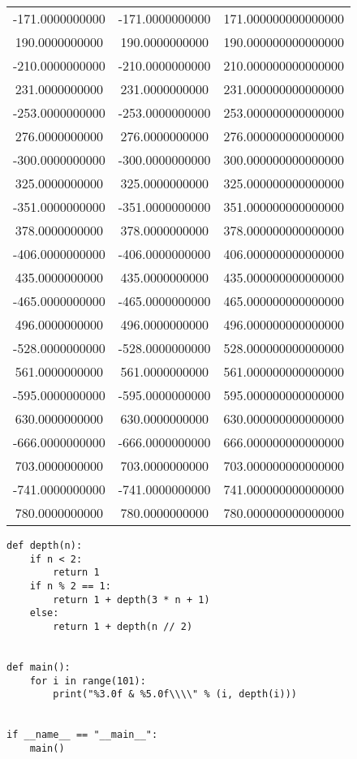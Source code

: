 \documentclass[12pt]{scrartcl}
\begin{document}
\begin{table}[H]
\begin{tabular}{ccc}
        -171.0000000000 & -171.0000000000 & 171.000000000000000 \\
        190.0000000000  & 190.0000000000  & 190.000000000000000 \\
        -210.0000000000 & -210.0000000000 & 210.000000000000000 \\
        231.0000000000  & 231.0000000000  & 231.000000000000000 \\
        -253.0000000000 & -253.0000000000 & 253.000000000000000 \\
        276.0000000000  & 276.0000000000  & 276.000000000000000 \\
        -300.0000000000 & -300.0000000000 & 300.000000000000000 \\
        325.0000000000  & 325.0000000000  & 325.000000000000000 \\
        -351.0000000000 & -351.0000000000 & 351.000000000000000 \\
        378.0000000000  & 378.0000000000  & 378.000000000000000 \\
        -406.0000000000 & -406.0000000000 & 406.000000000000000 \\
        435.0000000000  & 435.0000000000  & 435.000000000000000 \\
        -465.0000000000 & -465.0000000000 & 465.000000000000000 \\
        496.0000000000  & 496.0000000000  & 496.000000000000000 \\
        -528.0000000000 & -528.0000000000 & 528.000000000000000 \\
        561.0000000000  & 561.0000000000  & 561.000000000000000 \\
        -595.0000000000 & -595.0000000000 & 595.000000000000000 \\
        630.0000000000  & 630.0000000000  & 630.000000000000000 \\
        -666.0000000000 & -666.0000000000 & 666.000000000000000 \\
        703.0000000000  & 703.0000000000  & 703.000000000000000 \\
        -741.0000000000 & -741.0000000000 & 741.000000000000000 \\
        780.0000000000  & 780.0000000000  & 780.000000000000000 \\
    \end{tabular}
\end{table}

\problem{}
\problem{}

\begin{lstlisting}
def depth(n):
    if n < 2:
        return 1
    if n % 2 == 1:
        return 1 + depth(3 * n + 1)
    else:
        return 1 + depth(n // 2)


def main():
    for i in range(101):
        print("%3.0f & %5.0f\\\\" % (i, depth(i)))


if __name__ == "__main__":
    main()
\end{lstlisting}
\end{document}
